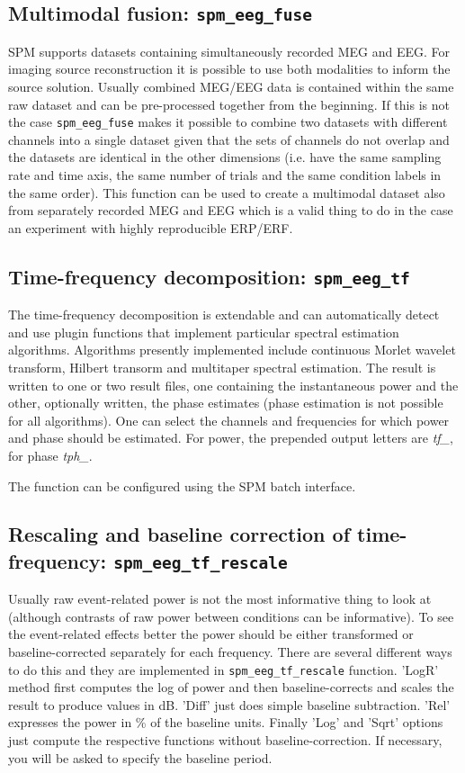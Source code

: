 \subsection{Multimodal fusion: \texttt{spm\_eeg\_fuse}}
SPM supports datasets containing simultaneously recorded MEG and EEG. For imaging source reconstruction it is possible to use both modalities to inform the source solution. Usually combined MEG/EEG data is contained within the same raw dataset and can be pre-processed together from the beginning. If this is not the case \texttt{spm\_eeg\_fuse} makes it possible to combine two datasets with different channels into a single dataset given that the sets of channels do not overlap and the datasets are identical in the other dimensions (i.e. have the same sampling rate and time axis, the same number of trials and the same condition labels in the same order). This function can be used to create a multimodal dataset also from separately recorded MEG and EEG which is a valid thing to do in the case an experiment with highly reproducible ERP/ERF.

\subsection{Time-frequency decomposition: \texttt{spm\_eeg\_tf}\label{sec:tf}}
The time-frequency decomposition is extendable and can automatically detect and use plugin functions that implement particular spectral estimation algorithms. Algorithms presently implemented include continuous Morlet wavelet transform, Hilbert transorm and multitaper spectral estimation. The result is written to one or two result files, one containing the instantaneous power and the other, optionally written, the phase estimates (phase estimation is not possible for all algorithms). One can select the channels and frequencies for which power and phase should be estimated. For power, the prepended output letters are \textit{tf\_}, for phase \textit{tph\_}.

The function can be configured using the SPM batch interface. 

\subsection{Rescaling and baseline correction of time-frequency: \texttt{spm\_eeg\_tf\_rescale}\label{sec:tfrescale}}
Usually raw event-related power is not the most informative thing to look at (although contrasts of raw power between conditions can be informative). To see the event-related effects better the power should be either transformed or baseline-corrected separately for each frequency. There are several different ways to do this and they are implemented in \texttt{spm\_eeg\_tf\_rescale} function. 'LogR' method first computes the log of power and then baseline-corrects and scales the result to produce values in dB. 'Diff' just does simple baseline subtraction. 'Rel' expresses the power in \% of the baseline units. Finally 'Log' and 'Sqrt' options just compute the respective functions without baseline-correction. If necessary, you will be asked to specify the baseline period.

